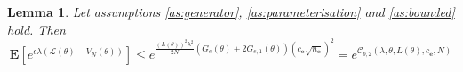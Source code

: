 \documentclass{article}
\def\rve{{\mathbf{e}}}
\def\rvu{{\mathbf{i}}}
\def\rvu{{\mathbf{u}}}
\def\rvy{{\mathbf{y}}}
\newtheorem{lemma}[theorem]{Lemma}
\newcommand{\bE}{\mathbf{E}}
\begin{document}
\begin{lemma}\label{lemma:bounded:mgf(L-V)}%
Let assumptions \ref{as:generator}, \ref{as:parameterisation}  and \ref{as:bounded} hold. Then
\begin{equation}
 \bE[e^{\epsilon \lambda(\mathcal{L}(\theta)-V_N(\theta))}] \leq 
  e^{\frac{(L(\theta))^2\lambda^2}{2N}(G_e(\theta)+2G_{e,1}(\theta))(c_{\rve}\sqrt{n_{\rve}})^2}
=e^{\mathcal{C}_{b,2}(\lambda,\theta,L(\theta),c_\rve,N)}
    \end{equation}
 \end{lemma}
\end{document}
